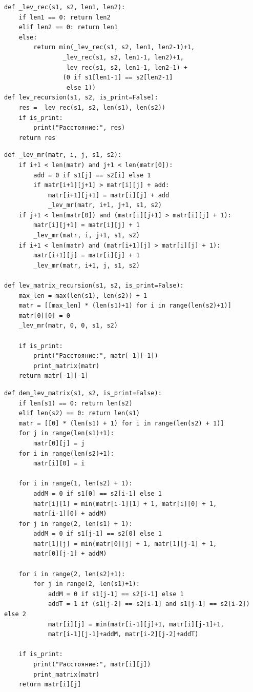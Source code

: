 \documentclass[10pt,a4paper]{report}
\begin{document}
	\begin{lstlisting}[caption = Функции нахождения расстояния Левенштейна рекурсивным методом.]
def _lev_rec(s1, s2, len1, len2):
	if len1 == 0: return len2
	elif len2 == 0: return len1
	else:
		return min(_lev_rec(s1, s2, len1, len2-1)+1,
				_lev_rec(s1, s2, len1-1, len2)+1,
				_lev_rec(s1, s2, len1-1, len2-1) + 
				(0 if s1[len1-1] == s2[len2-1]
				 else 1))
def lev_recursion(s1, s2, is_print=False):
	res = _lev_rec(s1, s2, len(s1), len(s2))
	if is_print:
		print("Расстояние:", res)
	return res
	\end{lstlisting}

	\begin{lstlisting}[caption = Функции нахождения расстояния Левенштейна рекурсивным методом с заполнением матрицы.]
def _lev_mr(matr, i, j, s1, s2):
	if i+1 < len(matr) and j+1 < len(matr[0]):
		add = 0 if s1[j] == s2[i] else 1
		if matr[i+1][j+1] > matr[i][j] + add:
			matr[i+1][j+1] = matr[i][j] + add
			_lev_mr(matr, i+1, j+1, s1, s2)
	if j+1 < len(matr[0]) and (matr[i][j+1] > matr[i][j] + 1):
		matr[i][j+1] = matr[i][j] + 1
		_lev_mr(matr, i, j+1, s1, s2)
	if i+1 < len(matr) and (matr[i+1][j] > matr[i][j] + 1):
		matr[i+1][j] = matr[i][j] + 1
		_lev_mr(matr, i+1, j, s1, s2)

def lev_matrix_recursion(s1, s2, is_print=False):
	max_len = max(len(s1), len(s2)) + 1
	matr = [[max_len] * (len(s1)+1) for i in range(len(s2)+1)]
	matr[0][0] = 0
	_lev_mr(matr, 0, 0, s1, s2)
	
	if is_print:
		print("Расстояние:", matr[-1][-1])
		print_matrix(matr)
	return matr[-1][-1]
	\end{lstlisting}


	\begin{lstlisting}[caption = Функция нахождения расстояния Дамерау-Левенштейна матричным методом.]
def dem_lev_matrix(s1, s2, is_print=False):
	if len(s1) == 0: return len(s2)
	elif len(s2) == 0: return len(s1)
	matr = [[0] * (len(s1) + 1) for i in range(len(s2) + 1)]
	for j in range(len(s1)+1):
		matr[0][j] = j
	for i in range(len(s2)+1):
		matr[i][0] = i
	
	for i in range(1, len(s2) + 1):
		addM = 0 if s1[0] == s2[i-1] else 1
		matr[i][1] = min(matr[i-1][1] + 1, matr[i][0] + 1,
		matr[i-1][0] + addM)
	for j in range(2, len(s1) + 1):
		addM = 0 if s1[j-1] == s2[0] else 1
		matr[1][j] = min(matr[0][j] + 1, matr[1][j-1] + 1,
		matr[0][j-1] + addM)
	
	for i in range(2, len(s2)+1):
		for j in range(2, len(s1)+1):
			addM = 0 if s1[j-1] == s2[i-1] else 1
			addT = 1 if (s1[j-2] == s2[i-1] and s1[j-1] == s2[i-2]) else 2
			matr[i][j] = min(matr[i-1][j]+1, matr[i][j-1]+1,
			matr[i-1][j-1]+addM, matr[i-2][j-2]+addT)
	
	if is_print:
		print("Расстояние:", matr[i][j])
		print_matrix(matr)
	return matr[i][j]
	\end{lstlisting}
	
\end{document}
